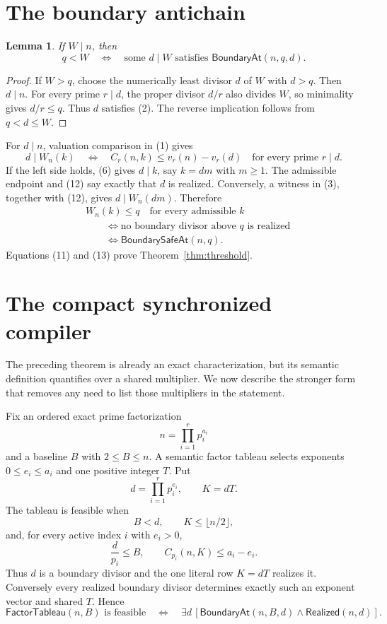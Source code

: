 \documentclass[11pt]{article}
\newtheorem{lemma}[theorem]{Lemma}
\theoremstyle{remark}
\newcommand{\BoundaryAt}{\mathsf{BoundaryAt}}
\newcommand{\Realized}{\mathsf{Realized}}
\newcommand{\BoundarySafeAt}{\mathsf{BoundarySafeAt}}
\newcommand{\FactorTableau}{\mathsf{FactorTableau}}
\begin{document}
\section{The boundary antichain}

\begin{lemma}\label{lem:boundary}
If $W\mid n$, then
\[
 q<W
 \quad\Longleftrightarrow\quad
 \text{some }d\mid W\text{ satisfies }\BoundaryAt(n,q,d).
\]
\end{lemma}

\begin{proof}
If $W>q$, choose the numerically least divisor $d$ of $W$ with $d>q$.
Then $d\mid n$.  For every prime $r\mid d$, the proper divisor $d/r$ also
divides $W$, so minimality gives $d/r\leq q$.  Thus $d$ satisfies (2).
The reverse implication follows from $q<d\leq W$.
\end{proof}

For $d\mid n$, valuation comparison in (1) gives
\[
 d\mid W_n(k)
 \quad\Longleftrightarrow\quad
 C_r(n,k)\leq v_r(n)-v_r(d)
 \quad\text{for every prime }r\mid d.                     \tag{12}
\]
If the left side holds, (6) gives $d\mid k$, say $k=dm$ with $m\geq1$.
The admissible endpoint and (12) say exactly that $d$ is realized.  Conversely,
a witness in (3), together with (12), gives $d\mid W_n(dm)$.  Therefore
\begin{equation}
 \begin{split}
 &W_n(k)\leq q\quad\text{for every admissible }k\\
 &\qquad\Longleftrightarrow
 \text{no boundary divisor above }q\text{ is realized}\\
 &\qquad\Longleftrightarrow \BoundarySafeAt(n,q).
 \end{split}
\tag{13}
\end{equation}
Equations (11) and (13) prove Theorem~\ref{thm:threshold}.

\section{The compact synchronized compiler}

The preceding theorem is already an exact characterization, but its semantic
definition quantifies over a shared multiplier.  We now describe the stronger
form that removes any need to list those multipliers in the statement.

Fix an ordered exact prime factorization
\[
 n=\prod_{i=1}^{r}p_i^{a_i}
\]
and a baseline $B$ with $2\leq B\leq n$.  A semantic factor tableau selects
exponents $0\leq e_i\leq a_i$ and one positive integer $T$.  Put
\[
 d=\prod_{i=1}^{r}p_i^{e_i},\qquad K=dT.
\]
The tableau is feasible when
\[
 B<d,\qquad K\leq\lfloor n/2\rfloor,
\]
and, for every active index $i$ with $e_i>0$,
\[
 \frac{d}{p_i}\leq B,
 \qquad
 C_{p_i}(n,K)\leq a_i-e_i.                              \tag{14}
\]
Thus $d$ is a boundary divisor and the one literal row $K=dT$ realizes it.
Conversely every realized boundary divisor determines exactly such an
exponent vector and shared $T$.  Hence
\[
 \FactorTableau(n,B)\text{ is feasible}
 \quad\Longleftrightarrow\quad
 \exists d\,[\BoundaryAt(n,B,d)\wedge\Realized(n,d)].   \tag{15}
\]
\end{document}
